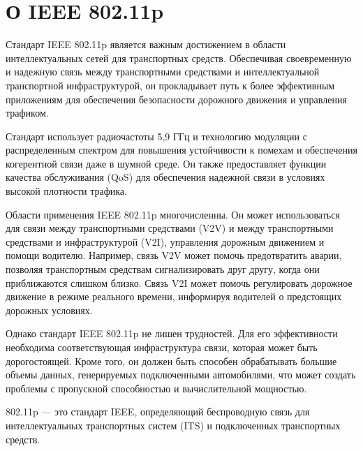  \section{О IEEE 802.11p}


 Стандарт IEEE 802.11p является важным достижением в области
 интеллектуальных сетей для транспортных средств. Обеспечивая
 своевременную и надежную связь между транспортными средствами и
 интеллектуальной транспортной инфраструктурой, он прокладывает путь к
 более эффективным приложениям для обеспечения безопасности дорожного
 движения и управления трафиком.

 Стандарт использует радиочастоты 5,9 ГГц и технологию модуляции с
 распределенным спектром для повышения устойчивости к помехам и
 обеспечения когерентной связи даже в шумной среде. Он также
 предоставляет функции качества обслуживания (QoS) для обеспечения
 надежной связи в условиях высокой плотности трафика.

 Области применения IEEE 802.11p многочисленны. Он может
 использоваться для связи между транспортными средствами (V2V) и между
 транспортными средствами и инфраструктурой (V2I), управления дорожным
 движением и помощи водителю. Например, связь V2V может помочь
 предотвратить аварии, позволяя транспортным средствам сигнализировать
 друг другу, когда они приближаются слишком близко. Связь V2I может
 помочь регулировать дорожное движение в режиме реального времени,
 информируя водителей о предстоящих дорожных условиях.

 Однако стандарт IEEE 802.11p не лишен трудностей. Для его
 эффективности необходима соответствующая инфраструктура связи,
 которая может быть дорогостоящей. Кроме того, он должен быть способен
 обрабатывать большие объемы данных, генерируемых подключенными
 автомобилями, что может создать проблемы с пропускной способностью и
 вычислительной мощностью.



 802.11p --- это стандарт IEEE, определяющий беспроводную связь для
 интеллектуальных транспортных систем (ITS) и подключенных
 транспортных средств.





